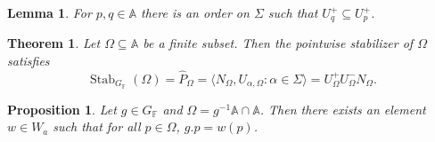 \documentclass[10pt,a4paper]{amsart}
\newtheorem{proposition}{Proposition}
\newtheorem{lemma}{Lemma}
\newtheorem{theorem}{Theorem}
\newcommand{\A}{\mathbb{A}}
\newcommand{\F}{\mathbb{F} }
\begin{document}
		\begin{lemma}\label{lem:BTstab_dir_lemma}
			For $p,q\in \A$ there is an order on $\Sigma$ such that $U_q^+ \subseteq U_p^+$.
		\end{lemma}

		\begin{theorem}\label{thm:BTstab_fin}%
			Let $\Omega \subseteq \A$ be a finite subset. Then the pointwise stabilizer of $\Omega$ satisfies
			$$
			\operatorname{Stab}_{G_\F}(\Omega) = \hat{P}_\Omega = \langle N_\Omega, U_{\alpha,\Omega} \colon \alpha \in \Sigma \rangle =  U_\Omega^+ U_\Omega^- N_\Omega.
			$$
		\end{theorem}

		\begin{proposition}\label{prop:A2_b}
			Let $g\in G_\F$ and $\Omega = g^{-1}\A \cap \A$. Then there exists an element $w\in W_a$ such that for all $p \in \Omega$, $g.p = w(p)$.
		\end{proposition}
\end{document}
